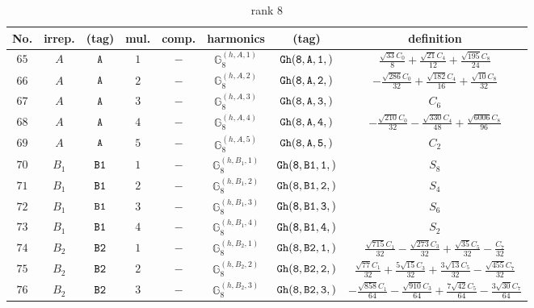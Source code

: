 \documentclass[fleqn,8pt]{jsarticle}
\begin{document}
\begin{table}[ht!]
\begin{center}
\caption{rank 8}
\renewcommand{\arraystretch}{1.3}
\begin{tabular}{cccccccc} \hline \hline
No. & irrep. & (tag) & mul. & comp. & harmonics & (tag) & definition \\ \hline
$ 65 $ & $ A $ & $ {\tt A} $ & $ 1 $ & $ - $ & $ \mathbb{G}_{8}^{(h,A,1)} $ & $ {\tt Gh(8,A,1,)} $ & $ \frac{\sqrt{33} C_{0}}{8} + \frac{\sqrt{21} C_{4}}{12} + \frac{\sqrt{195} C_{8}}{24} $ \\
$ 66 $ & $ A $ & $ {\tt A} $ & $ 2 $ & $ - $ & $ \mathbb{G}_{8}^{(h,A,2)} $ & $ {\tt Gh(8,A,2,)} $ & $ - \frac{\sqrt{286} C_{0}}{32} + \frac{\sqrt{182} C_{4}}{16} + \frac{\sqrt{10} C_{8}}{32} $ \\
$ 67 $ & $ A $ & $ {\tt A} $ & $ 3 $ & $ - $ & $ \mathbb{G}_{8}^{(h,A,3)} $ & $ {\tt Gh(8,A,3,)} $ & $ C_{6} $ \\
$ 68 $ & $ A $ & $ {\tt A} $ & $ 4 $ & $ - $ & $ \mathbb{G}_{8}^{(h,A,4)} $ & $ {\tt Gh(8,A,4,)} $ & $ - \frac{\sqrt{210} C_{0}}{32} - \frac{\sqrt{330} C_{4}}{48} + \frac{\sqrt{6006} C_{8}}{96} $ \\
$ 69 $ & $ A $ & $ {\tt A} $ & $ 5 $ & $ - $ & $ \mathbb{G}_{8}^{(h,A,5)} $ & $ {\tt Gh(8,A,5,)} $ & $ C_{2} $ \\
$ 70 $ & $ B_{1} $ & $ {\tt B1} $ & $ 1 $ & $ - $ & $ \mathbb{G}_{8}^{(h,B_{1},1)} $ & $ {\tt Gh(8,B1,1,)} $ & $ S_{8} $ \\
$ 71 $ & $ B_{1} $ & $ {\tt B1} $ & $ 2 $ & $ - $ & $ \mathbb{G}_{8}^{(h,B_{1},2)} $ & $ {\tt Gh(8,B1,2,)} $ & $ S_{4} $ \\
$ 72 $ & $ B_{1} $ & $ {\tt B1} $ & $ 3 $ & $ - $ & $ \mathbb{G}_{8}^{(h,B_{1},3)} $ & $ {\tt Gh(8,B1,3,)} $ & $ S_{6} $ \\
$ 73 $ & $ B_{1} $ & $ {\tt B1} $ & $ 4 $ & $ - $ & $ \mathbb{G}_{8}^{(h,B_{1},4)} $ & $ {\tt Gh(8,B1,4,)} $ & $ S_{2} $ \\
$ 74 $ & $ B_{2} $ & $ {\tt B2} $ & $ 1 $ & $ - $ & $ \mathbb{G}_{8}^{(h,B_{2},1)} $ & $ {\tt Gh(8,B2,1,)} $ & $ \frac{\sqrt{715} C_{1}}{32} - \frac{\sqrt{273} C_{3}}{32} + \frac{\sqrt{35} C_{5}}{32} - \frac{C_{7}}{32} $ \\
$ 75 $ & $ B_{2} $ & $ {\tt B2} $ & $ 2 $ & $ - $ & $ \mathbb{G}_{8}^{(h,B_{2},2)} $ & $ {\tt Gh(8,B2,2,)} $ & $ \frac{\sqrt{77} C_{1}}{32} + \frac{5 \sqrt{15} C_{3}}{32} + \frac{3 \sqrt{13} C_{5}}{32} - \frac{\sqrt{455} C_{7}}{32} $ \\
$ 76 $ & $ B_{2} $ & $ {\tt B2} $ & $ 3 $ & $ - $ & $ \mathbb{G}_{8}^{(h,B_{2},3)} $ & $ {\tt Gh(8,B2,3,)} $ & $ - \frac{\sqrt{858} C_{1}}{64} - \frac{\sqrt{910} C_{3}}{64} + \frac{7 \sqrt{42} C_{5}}{64} - \frac{3 \sqrt{30} C_{7}}{64} $ \\

\end{tabular}
\end{center}
\end{table}
\end{document}
